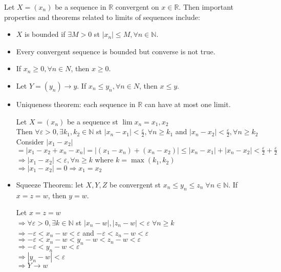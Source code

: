\documentclass{article}
\begin{document}
Let $X=(x_n)$ be a sequence in $\mathbb{R}$ convergent on $x \in \mathbb{R}$. Then important properties and theorems related to limits of sequences include:
\begin{itemize}
	\item $X$ is bounded if $\exists M > 0$ st $|x_n| \leq M, \forall n \in \mathbb{N}$. 
	\item Every convergent sequence is bounded but converse is not true.
	\item If $x_n \geq 0, \forall n \in N$, then $x \geq 0$.
	\item Let $Y = (y_n) \rightarrow y$. If $x_n \leq y_n, \forall n \in N$, then $x \leq y$.
	\item Uniqueness theorem: each sequence in $\mathbb{R}$ can have at most one limit.
	\begin{tcolorbox}[colback=lightgray!10,colframe=lightgray!10, fontupper=\linespread{1.5}\selectfont]
		Let $X=(x_n)$ be a sequence st $\lim x_n = x_1, x_2$ \\
		Then $\forall \varepsilon > 0, \exists k_1,k_2 \in \mathbb{N}$ st $|x_n-x_1|< \frac{\varepsilon}{2}, \forall n \geq k_1$ and $|x_n-x_2|< \frac{\varepsilon}{2}, \forall n \geq k_2$ \\
		Consider $|x_1-x_2|$ \\
		$ = |x_1-x_2 + x_n-x_n| = |(x_1-x_n) + (x_n-x_2)| \leq |x_n - x_1| + |x_n - x_2| < \frac{\varepsilon}{2} + \frac{\varepsilon}{2}$ \\
		$\Rightarrow |x_1-x_2| < \varepsilon, \forall n \geq k$ where $k = \max(k_1, k_2)$ \\
		$\Rightarrow |x_1-x_2| = 0 \Rightarrow x_1=x_2$
	\end{tcolorbox}
	\item Squeeze Theorem: let $X,Y,Z$ be convergent st $x_n \leq y_n \leq z_n \; \forall n \in \mathbb{N}$. If $x=z=w$, then $y=w$.
	\begin{tcolorbox}[colback=lightgray!10,colframe=lightgray!10, fontupper=\linespread{1.5}\selectfont]
		Let $x=z=w$ \\
		$\Rightarrow \forall \varepsilon > 0, \exists k \in \mathbb{N}$ st $|x_n-w|, |z_n-w| < \varepsilon \; \forall n \geq k$ \\
		$\Rightarrow - \varepsilon < x_n - w < \varepsilon$ and $- \varepsilon < z_n - w < \varepsilon$ \\
		$\Rightarrow - \varepsilon < x_n - w < y_n - w < z_n - w < \varepsilon$ \\
		$\Rightarrow - \varepsilon < y_n - w < \varepsilon$ \\
		$\Rightarrow |y_n-w| < \varepsilon$ \\
		$\Rightarrow Y \rightarrow w$		
	\end{tcolorbox}
\end{itemize}
\end{document}
